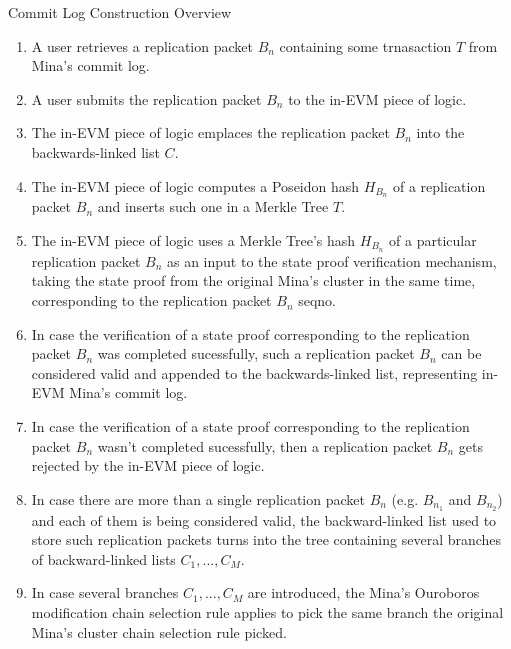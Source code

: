 \begin{algorithm}
    \caption{Commit Log Construction Overview}
    \label{commitlog}
    \begin{enumerate}
        \item A user retrieves a replication packet $B_{n}$ containing some trnasaction $T$ 
            from Mina's commit log.
        \item A user submits the replication packet $B_{n}$ to the in-EVM piece of logic.
        \item The in-EVM piece of logic emplaces the replication packet $B_{n}$
            into the backwards-linked list $C$.
        \item The in-EVM piece of logic computes a Poseidon hash $H_{B_{n}}$ of
            a replication packet $B_{n}$ and inserts such one in a Merkle Tree
            $T$.
        \item The in-EVM piece of logic uses a Merkle Tree's hash $H_{B_{n}}$ of
            a particular replication packet $B_{n}$ as an input to the
            state proof verification mechanism, taking the state proof from the
            original Mina's cluster in the same time, corresponding to the
            replication packet $B_{n}$ seqno.
        \item In case the verification of a state proof corresponding to the
            replication packet $B_{n}$ was completed sucessfully,
            such a replication packet $B_{n}$ can be considered valid and appended 
            to the backwards-linked list, representing in-EVM Mina's
            commit log.
        \item In case the verification of a state proof corresponding to the
            replication packet $B_{n}$ wasn't completed sucessfully, then a
            replication packet $B_{n}$ gets rejected by the in-EVM piece of
            logic.
        \item In case there are more than a single replication packet $B_{n}$
            (e.g. $B_{n_1}$ and $B_{n_2}$) and each of them is being considered
            valid, the backward-linked list used to store such replication
            packets turns into the tree containing several branches of
            backward-linked lists ${C_1, ... , C_M}$.
        \item In case several branches ${C_1, ... , C_M}$ are introduced, the
            Mina's Ouroboros modification chain selection rule applies to pick
            the same branch the original Mina's cluster chain selection rule
            picked.
    \end{enumerate}
\end{algorithm}

